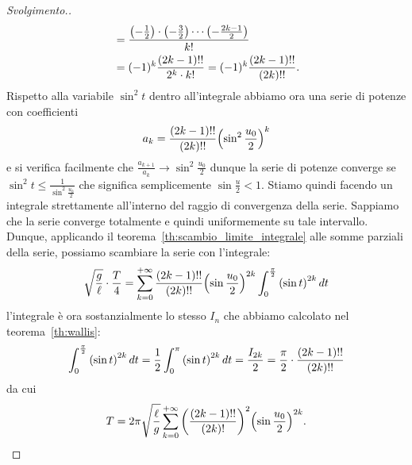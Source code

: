 \begin{proof}[Svolgimento.]
\begin{align*}
  &= \frac{{\left( -\frac 1 2 \right)}\cdot {\left( -\frac 3 2 \right)} \cdots {\left( -\frac{2k-1} 2 \right)}}{k!}\\
  &= (-1)^k\frac{(2k-1)!!}{2^k \cdot k!} = (-1)^k \frac{(2k-1)!!}{(2k)!!}.
\end{align*}
Rispetto alla variabile $\sin^2 t$ dentro all'integrale abbiamo ora una serie di potenze
con coefficienti
\[
 a_k = \frac{(2k-1)!!}{(2k)!!} {\left( \sin^2\frac{u_0} 2 \right)}^{k}
\]
e si verifica facilmente che
$  \frac{a_{k+1}}{a_k} \to \sin^2 \frac{u_0}{2}$
dunque la serie di potenze converge se
$ \sin^2 t \le \frac{1}{\sin^2 \frac{u_0}{2}}$
che significa semplicemente
$ \sin \frac u 2 < 1$.
Stiamo quindi facendo un integrale strettamente all'interno 
del raggio
di convergenza della serie. Sappiamo che la serie
converge totalmente e quindi uniformemente su
tale intervallo.
Dunque, applicando il teorema~\ref{th:scambio_limite_integrale} alle somme parziali 
della serie, 
possiamo scambiare la serie con l'integrale:
\[
\sqrt{\frac g \ell} \cdot\frac{T}{4}
= \sum_{k=0}^{+\infty}\frac{(2k-1)!!}{(2k)!!} {\left( \sin \frac{u_0}2 \right)}^{2k}
\int_0^{\frac \pi 2}  {\left( \sin t \right)}^{2k}\, dt
\]
l'integrale è ora sostanzialmente lo stesso $I_n$ che abbiamo 
calcolato nel teorema~\ref{th:wallis}:
\[
  \int_0^{\frac \pi 2} {\left( \sin t \right)}^{2k}\, dt
  = \frac 1 2 \int_0^{\pi} {\left( \sin t \right)}^{2k}\, dt
  = \frac{I_{2k}}{2}
  = \frac \pi 2 \cdot\frac{(2k-1)!!}{(2k)!!}
\]
da cui
\[
T
= 2\pi\sqrt{\frac \ell g}\sum_{k=0}^{+\infty} {\left( \frac{(2k-1)!!}{(2k)!} \right)}^2
{\left( \sin \frac{u_0} 2 \right)}^{2k}.
\]


\end{proof}
